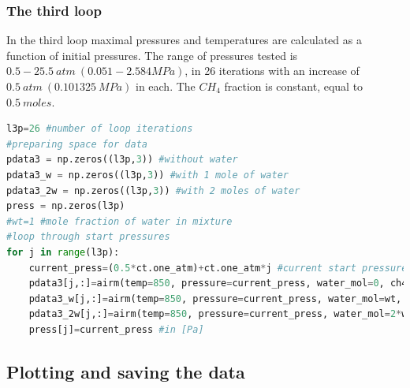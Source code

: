 \documentclass[a4paper]{article}
\begin{document}
\subsubsection{The third loop}
In the third loop maximal pressures and temperatures are calculated as a function of initial pressures. The range of pressures tested is $0.5-25.5\ atm\ (0.051-2.584 MPa)$, in 26 iterations with an increase of $0.5\ atm\ (0.101325\ MPa)$ in each. The $CH_4$ fraction is constant, equal to $0.5\ moles$.
\begin{lstlisting}[language=python]
l3p=26 #number of loop iterations
#preparing space for data
pdata3 = np.zeros((l3p,3)) #without water
pdata3_w = np.zeros((l3p,3)) #with 1 mole of water
pdata3_2w = np.zeros((l3p,3)) #with 2 moles of water
press = np.zeros(l3p)
#wt=1 #mole fraction of water in mixture
#loop through start pressures
for j in range(l3p):
    current_press=(0.5*ct.one_atm)+ct.one_atm*j #current start pressure in [Pa]
    pdata3[j,:]=airm(temp=850, pressure=current_press, water_mol=0, ch4_mol=5, plot=0)
    pdata3_w[j,:]=airm(temp=850, pressure=current_press, water_mol=wt, ch4_mol=5, plot=0)
    pdata3_2w[j,:]=airm(temp=850, pressure=current_press, water_mol=2*wt, ch4_mol=5, plot=0)
    press[j]=current_press #in [Pa]
\end{lstlisting}

\subsection{Plotting and saving the data}
\end{document}
